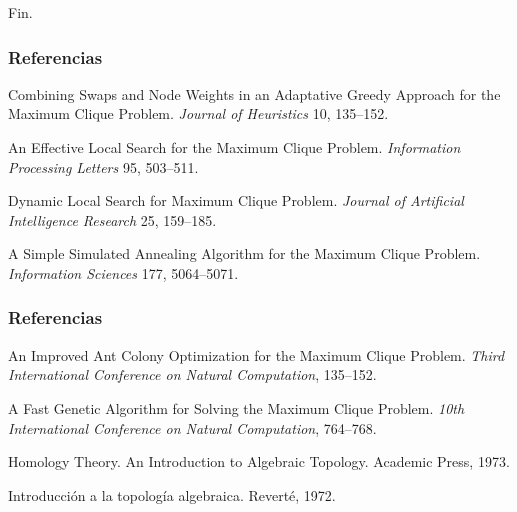 \documentclass{beamer}
\theoremstyle{theorem}
\begin{document}

\begin{frame}
\Huge{\centerline{Fin.}}
\end{frame}



\begin{frame}
\frametitle{Referencias}
\footnotesize{
  \begin{thebibliography}{99} %

      \newblock Combining Swaps and Node Weights in an Adaptative Greedy Approach for the Maximum Clique Problem.
      \newblock \emph{Journal of Heuristics} 10, 135--152.

      \newblock An Effective Local Search for the Maximum Clique Problem.
      \newblock \emph{Information Processing Letters} 95, 503--511.

      \newblock Dynamic Local Search for Maximum Clique Problem.
      \newblock \emph{Journal of Artificial Intelligence Research} 25, 159--185.

      \newblock A Simple Simulated Annealing Algorithm for the Maximum Clique Problem.
      \newblock \emph{Information Sciences} 177, 5064--5071.

  \end{thebibliography}
}
\end{frame}

\begin{frame}
  \frametitle{Referencias}
  \footnotesize{
    \begin{thebibliography}{99}

        \newblock An Improved Ant Colony Optimization for the Maximum Clique Problem.
        \newblock \emph{Third International Conference on Natural Computation}, 135--152.

        \newblock A Fast Genetic Algorithm for Solving the Maximum Clique Problem.
        \newblock \emph{10th International Conference on Natural Computation}, 764--768.

        \newblock Homology Theory. An Introduction to Algebraic Topology.
        \newblock Academic Press, 1973.

        \newblock Introducción a la topología algebraica.
        \newblock Reverté, 1972.

    \end{thebibliography}
  }
\end{frame}



\end{document}
